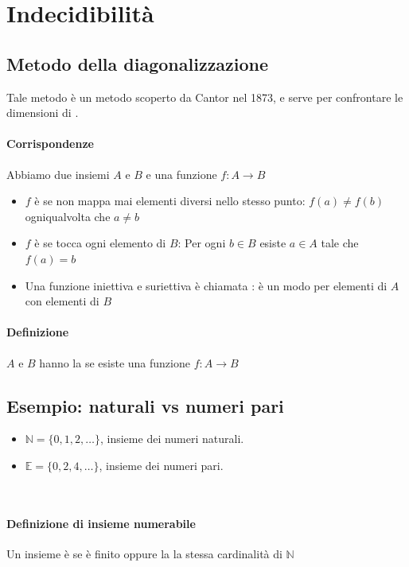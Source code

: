 \section{Indecidibilità}
\subsection{Metodo della diagonalizzazione}

Tale metodo è un metodo scoperto da Cantor nel 1873, e serve per confrontare le dimensioni di .


\paragraph{Corrispondenze}
Abbiamo due insiemi $A$ e $B$ e una funzione $f:A\rightarrow B$ 
\begin{itemize}
	\item $f$ è  se non mappa mai elementi diversi nello stesso punto: $f(a)\neq f(b)$ ogniqualvolta che $a\neq b$ 
	\item $f$ è  se tocca ogni elemento di $B$: 
  	Per ogni $b\in B$ esiste $a\in A$ tale che $f(a)=b$ 
	\item Una funzione iniettiva e suriettiva è chiamata : è un modo per  elementi di $A$ con elementi di $B$ 
\end{itemize}
\paragraph{Definizione}
$A$ e $B$ hanno la  se esiste una funzione  $f:A\rightarrow B$ 

\subsection{Esempio: naturali vs numeri pari}
\begin{itemize}
	\item $\mathbb{N}=\{0,1,2,\dots\}$, insieme dei numeri naturali.
	\item $\mathbb{E} = \{0,2,4,\dots\}$, insieme dei numeri pari.
\end{itemize}
\\

\paragraph{Definizione di insieme numerabile} 
Un insieme è  se è finito oppure la la stessa cardinalità di $\mathbb{N}$ 


